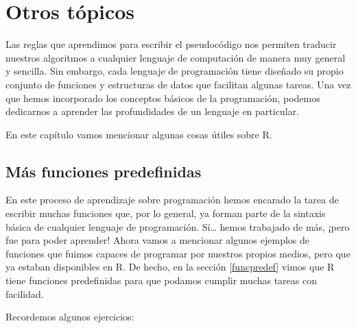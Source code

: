 \documentclass[
]{book}
\begin{document}
\hypertarget{otros-tuxf3picos}{%
\chapter{Otros tópicos}\label{otros-tuxf3picos}}

Las reglas que aprendimos para escribir el pseudocódigo nos permiten traducir nuestros algoritmos a cualquier lenguaje de computación de manera muy general y sencilla. Sin embargo, cada lenguaje de programación tiene diseñado su propio conjunto de funciones y estructuras de datos que facilitan algunas tareas. Una vez que hemos incorporado los conceptos básicos de la programación, podemos dedicarnos a aprender las profundidades de un lenguaje en particular.

En este capítulo vamos mencionar algunas cosas útiles sobre R.

\hypertarget{muxe1s-funciones-predefinidas}{%
\section{Más funciones predefinidas}\label{muxe1s-funciones-predefinidas}}

En este proceso de aprendizaje sobre programación hemos encarado la tarea de escribir muchas funciones que, por lo general, ya forman parte de la sintaxis básica de cualquier lenguaje de programación. Sí\ldots{} hemos trabajado de más, ¡pero fue para poder aprender! Ahora vamos a mencionar algunos ejemplos de funciones que fuimos capaces de programar por nuestros propios medios, pero que ya estaban disponibles en R. De hecho, en la sección \ref{funcpredef} vimos que R tiene funciones predefinidas para que podamos cumplir muchas tareas con facilidad.

Recordemos algunos ejercicios:
\end{document}
